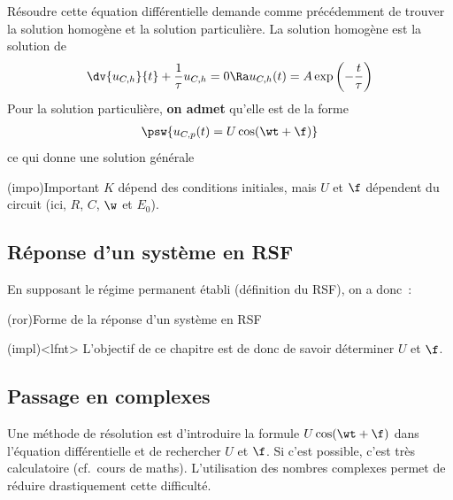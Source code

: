 \documentclass[../../main/main.tex]{subfiles}
\begin{document}
\bigbreak
Résoudre cette équation différentielle demande comme précédemment de trouver la
solution homogène et la solution particulière. La solution homogène est la
solution de
\begin{gather*}
	\dv{u_{C,h}}{t} + \frac{1}{\tau}u_{C,h} = 0
	\Ra
	u_{C,h}(t) = A\exp \left( - \frac{t}{\tau} \right)
\end{gather*}
Pour la solution particulière, \textbf{on admet} qu'elle est de la forme
\begin{gather*}
	\psw{
		u_{C,p}(t) = U\cos(\wt + \f)
	}
\end{gather*}
ce qui donne une solution générale
\psw{
	\[\boxed{u_C(t) = A\exp \left( - \frac{t}{\tau} \right) + U\cos(\wt + \f)}\]
}
\vspace{-15pt}
\begin{tcb}[label=ror:CIounon](impo){Important}
	$K$ dépend des conditions initiales, mais
	\smallbreak \centering\large
	$U$ et $\f$ dépendent du circuit (ici, $R$, $C$, $\w$ et $E_0$).
\end{tcb}

\subsection{Réponse d'un système en RSF}
En supposant le régime permanent établi (définition du RSF), on a donc~:
\begin{tcb}[label=prop:sortiersf](ror){Forme de la réponse d'un système en RSF}
\end{tcb}
\begin{tcb}(impl)<lfnt>{}
	L'objectif de ce chapitre est de donc de savoir déterminer $U$ et $\f$.
\end{tcb}
\subsection{Passage en complexes}
Une méthode de résolution est d'introduire la formule $U\cos(\wt+\f)$ dans
l'équation différentielle et de rechercher $U$ et $\f$. Si c'est possible, c'est
très calculatoire (cf.\ cours de maths). L'utilisation des nombres complexes
permet de réduire drastiquement cette difficulté.
\end{document}
